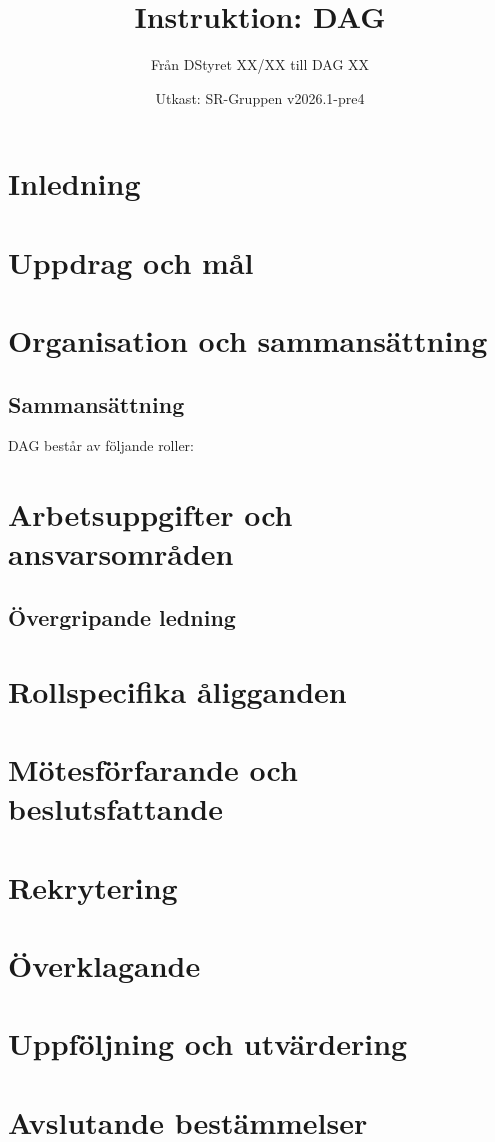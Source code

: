 \documentclass[a4paper]{dtekinstruktion}
\title{Instruktion: DAG}
\subtitle{Från DStyret XX/XX till DAG XX}
\date{Utkast: SR-Gruppen v2026.1-pre4}
\begin{document}
\makeheadfoot

\setcounter{tocdepth}{2}
\tableofcontents

\section{Inledning}

\section{Uppdrag och mål}

\section{Organisation och sammansättning}
\subsection{Sammansättning}
DAG består av följande roller:

\section{Arbetsuppgifter och ansvarsområden}
\subsection{Övergripande ledning}

\section{Rollspecifika åligganden}


\section{Mötesförfarande och beslutsfattande}

\section{Rekrytering}

\section{Överklagande}
\section{Uppföljning och utvärdering}

\section{Avslutande bestämmelser}
\end{document}
